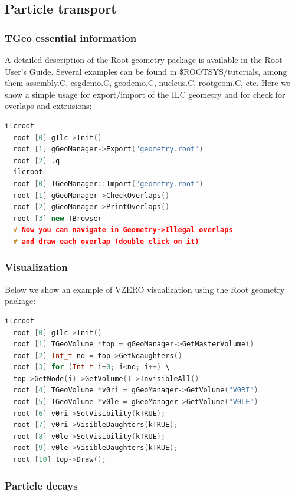 \documentclass[12pt,a4paper,twoside]{article}
\begin{document}
\subsection{Particle transport}

\subsubsection{TGeo essential information}

A detailed description of the Root geometry package is available in
the Root User's Guide\cite{RootUsersGuide}. Several examples can be
found in \$ROOTSYS/tutorials, among them assembly.C, csgdemo.C,
geodemo.C, nucleus.C, rootgeom.C, etc. Here we show a simple usage for
export/import of the ILC geometry and for check for overlaps and
extrusions:

\begin{lstlisting}[language=C++]
  ilcroot
  root [0] gIlc->Init()
  root [1] gGeoManager->Export("geometry.root")
  root [2] .q
  ilcroot
  root [0] TGeoManager::Import("geometry.root")
  root [1] gGeoManager->CheckOverlaps()
  root [2] gGeoManager->PrintOverlaps()
  root [3] new TBrowser
  # Now you can navigate in Geometry->Illegal overlaps
  # and draw each overlap (double click on it)
\end{lstlisting}

\subsubsection{Visualization}

Below we show an example of VZERO visualization using the Root
geometry package:

\begin{lstlisting}[language=C++]
  ilcroot
  root [0] gIlc->Init()
  root [1] TGeoVolume *top = gGeoManager->GetMasterVolume()
  root [2] Int_t nd = top->GetNdaughters()
  root [3] for (Int_t i=0; i<nd; i++) \
  top->GetNode(i)->GetVolume()->InvisibleAll()
  root [4] TGeoVolume *v0ri = gGeoManager->GetVolume("V0RI")
  root [5] TGeoVolume *v0le = gGeoManager->GetVolume("V0LE")
  root [6] v0ri->SetVisibility(kTRUE);
  root [7] v0ri->VisibleDaughters(kTRUE);
  root [8] v0le->SetVisibility(kTRUE);
  root [9] v0le->VisibleDaughters(kTRUE);
  root [10] top->Draw();

\end{lstlisting}

\subsubsection{Particle decays}
\end{document}
